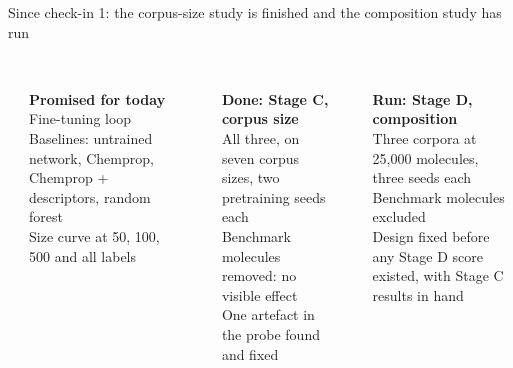 \documentclass[aspectratio=169,10pt]{beamer}
\begin{document}
\begin{frame}{Since check-in 1: the corpus-size study is finished and the
composition study has run}
\begin{columns}[t,onlytextwidth]
\raggedright
{\color{hair}\rule{\linewidth}{1.2mm}}\\[1.5mm]
\textbf{Promised for today}\\[2mm]
Fine-tuning loop\\[1.5mm]
Baselines: untrained network, Chemprop, Chemprop + descriptors, random
forest\\[1.5mm]
Size curve at 50, 100, 500 and all labels
\raggedright
{\color{accent}\rule{\linewidth}{1.2mm}}\\[1.5mm]
\textbf{Done: Stage C, corpus size}\\[2mm]
All three, on seven corpus sizes, two pretraining seeds each\\[1.5mm]
Benchmark molecules removed: no visible effect\\[1.5mm]
One artefact in the probe found and fixed
\raggedright
{\color{accent}\rule{\linewidth}{1.2mm}}\\[1.5mm]
\textbf{Run: Stage D, composition}\\[2mm]
Three corpora at 25,000 molecules, three seeds each\\[1.5mm]
Benchmark molecules excluded\\[1.5mm]
Design fixed before any Stage D score existed, with Stage C results in hand
\end{columns}

\vspace{1mm}
\end{frame}
\end{document}
